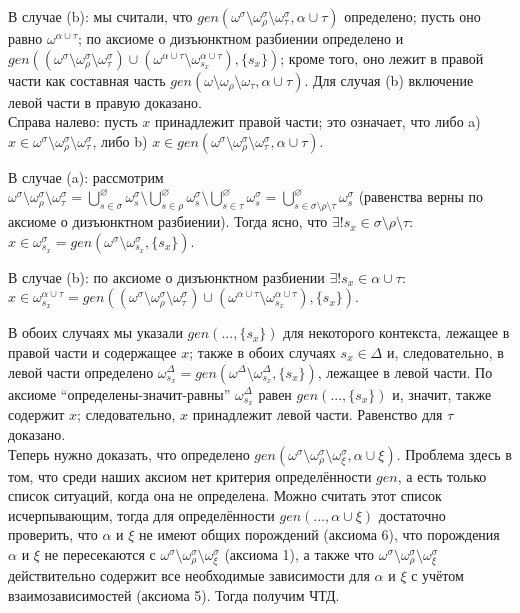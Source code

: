 В случае (b): мы считали, что $gen(\omega^\sigma \setminus \omega^\sigma_\rho \setminus \omega^\sigma_\tau, \alpha\cup\tau)$ определено; пусть оно равно $\omega^{\alpha\cup\tau}$; по аксиоме о дизъюнктном разбиении определено и $gen((\omega^\sigma \setminus \omega^\sigma_\rho \setminus \omega^\sigma_\tau) \cup (\omega^{\alpha\cup\tau} \setminus \omega^{\alpha\cup\tau}_{s_x}), \{s_x\})$; кроме того, оно лежит в правой части как составная часть $gen(\omega \setminus \omega_\rho \setminus \omega_\tau, \alpha\cup\tau)$. Для случая (b) включение левой части в правую доказано.
\\

Справа налево: пусть $x$ принадлежит правой части; это означает, что либо a) $x \in \omega^\sigma \setminus \omega^\sigma_\rho \setminus \omega^\sigma_\tau$, либо b) $x \in gen(\omega^\sigma \setminus \omega^\sigma_\rho \setminus \omega^\sigma_\tau, \alpha \cup \tau)$.

В случае (a): рассмотрим $\omega^\sigma \setminus \omega^\sigma_\rho \setminus \omega^\sigma_\tau = \bigcup^\varnothing_{s \in \sigma} \omega^\sigma_s \setminus \bigcup^\varnothing_{s \in \rho} \omega^\sigma_s \setminus \bigcup^\varnothing_{s \in \tau} \omega^\sigma_s = \bigcup^\varnothing_{s \in \sigma\setminus\rho\setminus\tau} \omega^\sigma_s$ (равенства верны по аксиоме о дизъюнктном разбиении). Тогда ясно, что $\exists ! s_x \in \sigma\setminus\rho\setminus\tau$: $x \in \omega^\sigma_{s_x} = gen(\omega^\sigma \setminus \omega^\sigma_{s_x}, \{s_x\})$.

В случае (b): по аксиоме о дизъюнктном разбиении $\exists ! s_x \in \alpha\cup\tau$: $x \in \omega^{\alpha\cup\tau}_{s_x} = gen((\omega^\sigma \setminus \omega^\sigma_\rho \setminus \omega^\sigma_\tau) \cup (\omega^{\alpha\cup\tau} \setminus \omega^{\alpha\cup\tau}_{s_x}), \{s_x\})$.

В обоих случаях мы указали $gen(..., \{s_x\})$ для некоторого контекста, лежащее в правой части и содержащее $x$; также в обоих случаях $s_x \in \Delta$ и, следовательно, в левой части определено $\omega^\Delta_{s_x} = gen(\omega^\Delta\setminus\omega^\Delta_{s_x}, \{s_x\})$, лежащее в левой части. По аксиоме ``определены-значит-равны''  $\omega^\Delta_{s_x}$ равен $gen(..., \{s_x\})$ и, значит, также содержит $x$; следовательно, $x$ принадлежит левой части. Равенство для $\tau$ доказано.
\\

Теперь нужно доказать, что определено $gen(\omega^\sigma \setminus \omega^\sigma_\rho \setminus \omega^\sigma_\xi, \alpha\cup\xi)$. Проблема здесь в том, что среди наших аксиом нет критерия определённости $gen$, а есть только список ситуаций, когда она не определена. Можно считать этот список исчерпывающим, тогда для определённости $gen(..., \alpha\cup\xi)$ достаточно проверить, что $\alpha$ и $\xi$ не имеют общих порождений (аксиома 6), что порождения $\alpha$ и $\xi$ не пересекаются с $\omega^\sigma \setminus \omega^\sigma_\rho \setminus \omega^\sigma_\xi$ (аксиома 1), а также что $\omega^\sigma \setminus \omega^\sigma_\rho \setminus \omega^\sigma_\xi$ действительно содержит все необходимые зависимости для $\alpha$ и $\xi$ с учётом взаимозависимостей (аксиома 5). Тогда получим ЧТД.


